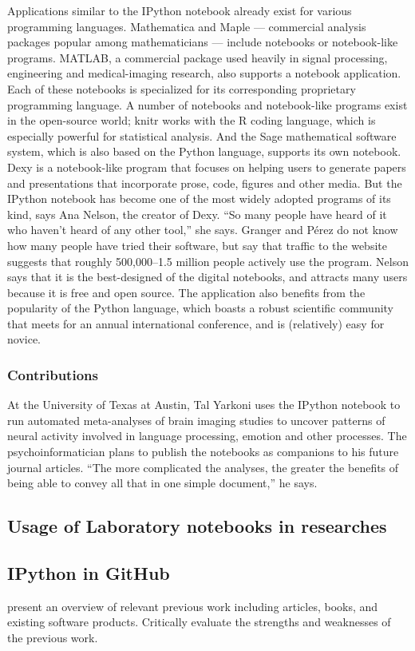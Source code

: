 Applications similar to the IPython notebook
already exist for various programming
languages. Mathematica and Maple — commercial
analysis packages popular among mathematicians
— include notebooks or notebook-like
programs. MATLAB, a commercial package
used heavily in signal processing, engineering
and medical-imaging research, also supports a
notebook application. Each of these notebooks
is specialized for its corresponding proprietary
programming language.
A number of notebooks and notebook-like
programs exist in the open-source world; knitr
works with the R coding language, which is
especially powerful for statistical analysis. And
the Sage mathematical software system, which
is also based on the Python language, supports
its own notebook. Dexy is a notebook-like program
that focuses on helping users to generate
papers and presentations that incorporate prose,
code, figures and other media.
But the IPython notebook has become one
of the most widely adopted programs of its
kind, says Ana Nelson, the creator of Dexy. “So
many people have heard of it who haven’t heard
of any other tool,” she says. Granger and Pérez
do not know how many people have tried their
software, but say that traffic to the website suggests
that roughly 500,000–1.5 million people
actively use the program. Nelson says that it is
the best-designed of the digital notebooks, and
attracts many users because it is free and open
source. The application also benefits from the
popularity of the Python language, which boasts
a robust scientific community that meets for an
annual international conference, and is (relatively)
easy for novice.

\subsubsection{Contributions}

At the University of Texas at Austin, Tal Yarkoni
uses the IPython notebook to run automated
meta-analyses of brain imaging studies to
uncover patterns of neural activity involved in
language processing, emotion and other processes.
The psychoinformatician plans to publish
the notebooks as companions to his future
journal articles. “The more complicated the
analyses, the greater the benefits of being able to convey all that in one simple document,” he says.
\cite{shen2014interactive}

\subsection{Usage of Laboratory notebooks in researches}
\subsection{IPython in GitHub}
present an overview of relevant previous work including articles, books, and existing software products. Critically evaluate the strengths and weaknesses of the previous work.